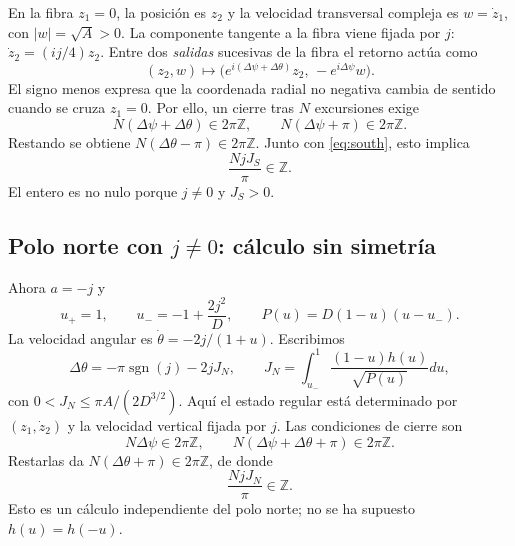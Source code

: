 \documentclass[11pt,a4paper]{article}
\theoremstyle{remark}\newtheorem{remark}[theorem]{Observación}
\newcommand{\Z}{\mathbb Z}
\newcommand{\sgn}{\operatorname{sgn}}
\begin{document}
En la fibra $z_1=0$, la posición es $z_2$ y la velocidad transversal compleja es $w=\dot z_1$, con $|w|=\sqrt A>0$. La componente tangente a la fibra viene fijada por $j$: $\dot z_2=(ij/4)z_2$. Entre dos \emph{salidas} sucesivas de la fibra el retorno actúa como
\[
(z_2,w)\longmapsto\bigl(e^{i(\Delta\psi+\Delta\theta)}z_2,\,-e^{i\Delta\psi}w\bigr).
\]
El signo menos expresa que la coordenada radial no negativa cambia de sentido cuando se cruza $z_1=0$. Por ello, un cierre tras $N$ excursiones exige
\[
N(\Delta\psi+\Delta\theta)\in2\pi\Z,\qquad
N(\Delta\psi+\pi)\in2\pi\Z.
\]
Restando se obtiene $N(\Delta\theta-\pi)\in2\pi\Z$. Junto con \eqref{eq:south}, esto implica
\begin{equation}\label{eq:integerS}
\frac{NjJ_S}{\pi}\in\Z.
\end{equation}
El entero es no nulo porque $j\ne0$ y $J_S>0$.

\subsection{Polo norte con $j\ne0$: cálculo sin simetría}
Ahora $a=-j$ y
\[
u_+=1,\qquad u_-=-1+\frac{2j^2}{D},\qquad P(u)=D(1-u)(u-u_-).
\]
La velocidad angular es $\dot\theta=-2j/(1+u)$. Escribimos
\[
\Delta\theta=-\pi\sgn(j)-2jJ_N,\qquad
J_N=\int_{u_-}^{1}\frac{(1-u)h(u)}{\sqrt{P(u)}}du,
\]
con $0<J_N\le\pi A/(2D^{3/2})$. Aquí el estado regular está determinado por $(z_1,\dot z_2)$ y la velocidad vertical fijada por $j$. Las condiciones de cierre son
\[
N\Delta\psi\in2\pi\Z,\qquad N(\Delta\psi+\Delta\theta+\pi)\in2\pi\Z.
\]
Restarlas da $N(\Delta\theta+\pi)\in2\pi\Z$, de donde
\begin{equation}\label{eq:integerN}
\frac{NjJ_N}{\pi}\in\Z.
\end{equation}
Esto es un cálculo independiente del polo norte; no se ha supuesto $h(u)=h(-u)$.
\end{document}
